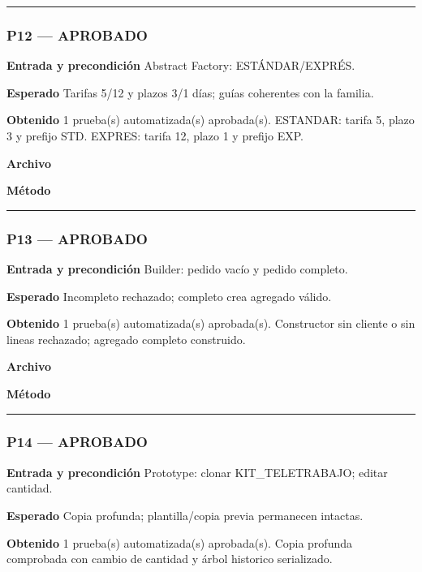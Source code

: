 \medskip\hrule\medskip
\subsubsection*{P12 --- APROBADO}
\textbf{Entrada y precondición} Abstract Factory: ESTÁNDAR/EXPRÉS.

\textbf{Esperado} Tarifas 5/12 y plazos 3/1 días; guías coherentes con la familia.

\textbf{Obtenido} 1 prueba(s) automatizada(s) aprobada(s). ESTANDAR: tarifa 5, plazo 3 y prefijo STD. EXPRES: tarifa 12, plazo 1 y prefijo EXP.

\textbf{Archivo} \href{https://github.com/Alan77-bot/LogiMarket360Alan/blob/68bda51063441415524ede51bdf61649ee9b4973/tests/LogiMarket.Tests/Patrones/CreacionalesTests.cs}{}

\textbf{Método} 

\medskip\hrule\medskip
\subsubsection*{P13 --- APROBADO}
\textbf{Entrada y precondición} Builder: pedido vacío y pedido completo.

\textbf{Esperado} Incompleto rechazado; completo crea agregado válido.

\textbf{Obtenido} 1 prueba(s) automatizada(s) aprobada(s). Constructor sin cliente o sin lineas rechazado; agregado completo construido.

\textbf{Archivo} \href{https://github.com/Alan77-bot/LogiMarket360Alan/blob/68bda51063441415524ede51bdf61649ee9b4973/tests/LogiMarket.Tests/Patrones/CreacionalesTests.cs}{}

\textbf{Método} 

\medskip\hrule\medskip
\subsubsection*{P14 --- APROBADO}
\textbf{Entrada y precondición} Prototype: clonar KIT\_TELETRABAJO; editar cantidad.

\textbf{Esperado} Copia profunda; plantilla/copia previa permanecen intactas.

\textbf{Obtenido} 1 prueba(s) automatizada(s) aprobada(s). Copia profunda comprobada con cambio de cantidad y árbol historico serializado.

